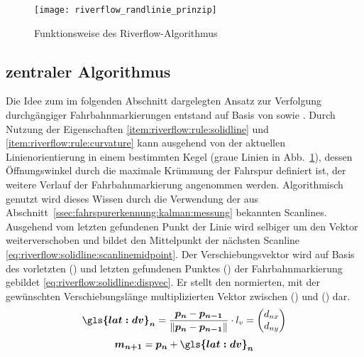 \begin{figure}[H]
  \centering
  \texttt{[image: riverflow\_randlinie\_prinzip]}
  \caption{Funktionsweise des Riverflow-Algorithmus}
  \label{fig:riverflow:randlinie:prinzip}
\end{figure}

\subsection{zentraler Algorithmus}
\label{sssec:fahrspurerkennung:riverflow:randlinie:zentraler_algorithmus}
Die Idee zum im folgenden Abschnitt dargelegten Ansatz zur Verfolgung durchgängiger Fahrbahnmarkierungen entstand auf Basis von \autocite{drauschkeEchtzeitfaehigeStartpunktalgorithmenFuer2016} sowie \autocite{limRiverFlowLane2012}.
Durch Nutzung der Eigenschaften \ref{item:riverflow:rule:solidline} und  \ref{item:riverflow:rule:curvature} kann ausgehend von der aktuellen Linienorientierung in einem bestimmten Kegel (graue Linien in Abb.~\ref{fig:riverflow:randlinie:prinzip}), dessen Öffnungswinkel durch die maximale Krümmung der Fahrspur definiert ist, der weitere Verlauf der Fahrbahnmarkierung angenommen werden.
Algorithmisch genutzt wird dieses Wissen durch die Verwendung der aus Abschnitt~\ref{ssec:fahrspurerkennung:kalman:messung} bekannten Scanlines.
Ausgehend vom letzten gefundenen Punkt der Linie  wird selbiger um den Vektor  weiterverschoben und bildet den Mittelpunkt   der nächsten Scanline \eqref{eq:riverflow:solidline:scanlinemidpoint}. Der Verschiebungsvektor  wird auf Basis des vorletzten () und letzten gefundenen Punktes () der Fahrbahnmarkierung gebildet \eqref{eq:riverflow:solidline:dispvec}. Er stellt den normierten, mit der gewünschten Verschiebungslänge  multiplizierten Vektor zwischen () und () dar.
\begin{equation}
\label{eq:riverflow:solidline:dispvec}
\vct{\gls{lat:dv}_n} =  \frac{\pnt{p_{n}} - \pnt{p_{n-1}}}{\nrm{\pnt{p_{n}} - \pnt{p_{n-1}}}} \cdot \scl{l_v}
= 
\begin{pmatrix}
\scl{d_{nx}} \\
\scl{d_{ny}}
\end{pmatrix}
\end{equation}
\begin{equation}
\label{eq:riverflow:solidline:scanlinemidpoint}
\pnt{m_{n+1}} =  \pnt{p_n} + \vct{\gls{lat:dv}_n}
\end{equation}
